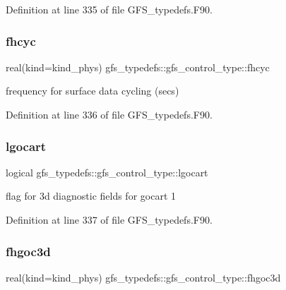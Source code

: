 Definition at line 335 of file G\+F\+S\+\_\+typedefs.\+F90.

\mbox{\label{structgfs__typedefs_1_1gfs__control__type_a92f31b689b44b2199be7b8e398ceb827}} 
\subsubsection{fhcyc}
{\footnotesize\ttfamily real(kind=kind\+\_\+phys) gfs\+\_\+typedefs\+::gfs\+\_\+control\+\_\+type\+::fhcyc}



frequency for surface data cycling (secs) 



Definition at line 336 of file G\+F\+S\+\_\+typedefs.\+F90.

\mbox{\label{structgfs__typedefs_1_1gfs__control__type_aa02bd34a9b39b8cb302acbe372e59872}} 
\subsubsection{lgocart}
{\footnotesize\ttfamily logical gfs\+\_\+typedefs\+::gfs\+\_\+control\+\_\+type\+::lgocart}



flag for 3d diagnostic fields for gocart 1 



Definition at line 337 of file G\+F\+S\+\_\+typedefs.\+F90.

\mbox{\label{structgfs__typedefs_1_1gfs__control__type_ad38e700e74f950699688c6ec70b3fd96}} 
\subsubsection{fhgoc3d}
{\footnotesize\ttfamily real(kind=kind\+\_\+phys) gfs\+\_\+typedefs\+::gfs\+\_\+control\+\_\+type\+::fhgoc3d}



